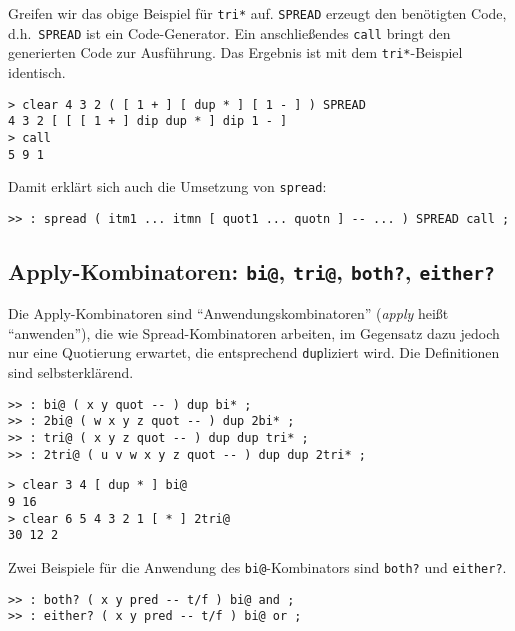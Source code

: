 Greifen wir das obige Beispiel für \verb|tri*| auf. \verb|SPREAD| erzeugt den benötigten Code, d.h.\ \verb|SPREAD| ist ein Code-Generator. Ein anschließendes \verb|call| bringt den generierten Code zur Ausführung. Das Ergebnis ist mit dem \verb|tri*|-Beispiel identisch.

\begin{verbatim}
> clear 4 3 2 ( [ 1 + ] [ dup * ] [ 1 - ] ) SPREAD
4 3 2 [ [ [ 1 + ] dip dup * ] dip 1 - ]
> call
5 9 1
\end{verbatim}

Damit erklärt sich auch die Umsetzung von \verb|spread|:

\begin{verbatim}
>> : spread ( itm1 ... itmn [ quot1 ... quotn ] -- ... ) SPREAD call ;
\end{verbatim}

\subsection{Apply-Kombinatoren: \texttt{bi@}, \texttt{tri@}, \texttt{both?}, \texttt{either?}}
\label{Sec:applyCombinators}

Die Apply-Kombinatoren sind "`Anwendungskombinatoren"' (\emph{apply} heißt "`anwenden"'), die wie Spread-Kombinatoren arbeiten, im Gegensatz dazu jedoch nur eine Quotierung erwartet, die entsprechend \verb|dup|liziert wird. Die Definitionen sind selbsterklärend. 

\begin{verbatim}
>> : bi@ ( x y quot -- ) dup bi* ;
>> : 2bi@ ( w x y z quot -- ) dup 2bi* ;
>> : tri@ ( x y z quot -- ) dup dup tri* ;
>> : 2tri@ ( u v w x y z quot -- ) dup dup 2tri* ;
\end{verbatim}

\begin{verbatim}
> clear 3 4 [ dup * ] bi@
9 16
> clear 6 5 4 3 2 1 [ * ] 2tri@
30 12 2
\end{verbatim}

Zwei Beispiele für die Anwendung des \verb|bi@|-Kombinators sind \verb|both?| und \verb|either?|.

\begin{verbatim}
>> : both? ( x y pred -- t/f ) bi@ and ;
>> : either? ( x y pred -- t/f ) bi@ or ;
\end{verbatim}

